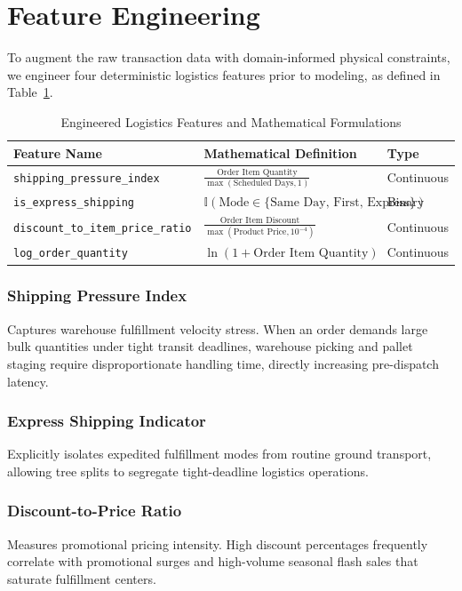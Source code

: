 \documentclass[journal,10pt,twocolumn]{IEEEtran}
\begin{document}
\section{Feature Engineering}
\label{sec:feature_engineering}

To augment the raw transaction data with domain-informed physical constraints, we engineer four deterministic logistics features prior to modeling, as defined in Table~\ref{tab:features}.

\begin{table}[htbp]
\caption{Engineered Logistics Features and Mathematical Formulations}
\label{tab:features}
\centering
\begin{tabularx}{\columnwidth}{lXl}
\toprule
\textbf{Feature Name} & \textbf{Mathematical Definition} & \textbf{Type} \\
\midrule
\texttt{shipping\_pressure\_index} & $\displaystyle \frac{\text{Order Item Quantity}}{\max(\text{Scheduled Days}, 1)}$ & Continuous \\
\addlinespace
\texttt{is\_express\_shipping} & $\displaystyle \mathbb{I}(\text{Mode} \in \{\text{Same Day, First, Express}\})$ & Binary \\
\addlinespace
\texttt{discount\_to\_item\_price\_ratio} & $\displaystyle \frac{\text{Order Item Discount}}{\max(\text{Product Price}, 10^{-4})}$ & Continuous \\
\addlinespace
\texttt{log\_order\_quantity} & $\displaystyle \ln(1 + \text{Order Item Quantity})$ & Continuous \\
\bottomrule
\end{tabularx}
\end{table}

\subsubsection{Shipping Pressure Index} Captures warehouse fulfillment velocity stress. When an order demands large bulk quantities under tight transit deadlines, warehouse picking and pallet staging require disproportionate handling time, directly increasing pre-dispatch latency.
\subsubsection{Express Shipping Indicator} Explicitly isolates expedited fulfillment modes from routine ground transport, allowing tree splits to segregate tight-deadline logistics operations.
\subsubsection{Discount-to-Price Ratio} Measures promotional pricing intensity. High discount percentages frequently correlate with promotional surges and high-volume seasonal flash sales that saturate fulfillment centers.
\end{document}
